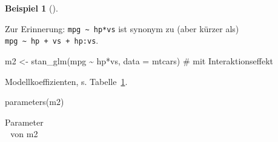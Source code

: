 \documentclass[
  ngerman,
  letterpaper,
  twoside,
  open=any]{scrbook}
\newenvironment{Shaded}{\begin{snugshade}}{\end{snugshade}}
\newcommand{\AttributeTok}[1]{\textcolor[rgb]{0.40,0.45,0.13}{#1}}
\newcommand{\CommentTok}[1]{\textcolor[rgb]{0.37,0.37,0.37}{#1}}
\newcommand{\FunctionTok}[1]{\textcolor[rgb]{0.28,0.35,0.67}{#1}}
\newcommand{\NormalTok}[1]{\textcolor[rgb]{0.00,0.23,0.31}{#1}}
\newcommand{\OtherTok}[1]{\textcolor[rgb]{0.00,0.23,0.31}{#1}}
\newcommand{\SpecialCharTok}[1]{\textcolor[rgb]{0.37,0.37,0.37}{#1}}
\theoremstyle{definition}
\newtheorem{example}{Beispiel}[chapter]
\theoremstyle{plain}
\theoremstyle{definition}
\theoremstyle{definition}
\theoremstyle{remark}
\begin{document}
\begin{example}[]
\begin{tcolorbox}
Zur Erinnerung: \texttt{mpg\ \textasciitilde{}\ hp*vs} ist synonym zu
(aber kürzer als) \texttt{mpg\ \textasciitilde{}\ hp\ +\ vs\ +\ hp:vs}.

\end{tcolorbox}

\begin{Shaded}
\begin{Highlighting}[]
\NormalTok{m2 }\OtherTok{\textless{}{-}} \FunctionTok{stan\_glm}\NormalTok{(mpg }\SpecialCharTok{\textasciitilde{}}\NormalTok{ hp}\SpecialCharTok{*}\NormalTok{vs, }\AttributeTok{data =}\NormalTok{ mtcars)  }\CommentTok{\# mit Interaktionseffekt}
\end{Highlighting}
\end{Shaded}

Modellkoeffizienten, s. Tabelle~\ref{tbl-m2-params}.

\begin{Shaded}
\begin{Highlighting}[]
\FunctionTok{parameters}\NormalTok{(m2)}
\end{Highlighting}
\end{Shaded}

{

\begin{longtable}[]{@{}
  >{\raggedright\arraybackslash}p{}
  >{\centering\arraybackslash}p{}
  >{\centering\arraybackslash}p{}
  >{\centering\arraybackslash}p{}
  >{\centering\arraybackslash}p{}
  >{\centering\arraybackslash}p{}
  >{\centering\arraybackslash}p{}@{}}

\caption{\label{tbl-m2-params}Parameter von m2}

\tabularnewline


\end{longtable}}
\end{example}
\end{document}
